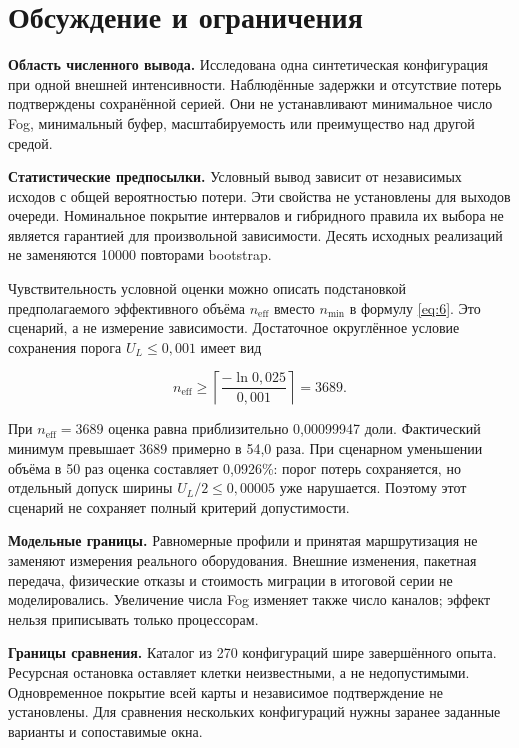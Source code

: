 \hypertarget{ux43eux431ux441ux443ux436ux434ux435ux43dux438ux435-ux438-ux43eux433ux440ux430ux43dux438ux447ux435ux43dux438ux44f}{%
\FloatBarrier
\section{Обсуждение и ограничения}}

\textbf{Область численного вывода.} Исследована одна синтетическая конфигурация при одной внешней интенсивности. Наблюдённые задержки и отсутствие потерь подтверждены сохранённой серией. Они не устанавливают минимальное число Fog, минимальный буфер, масштабируемость или преимущество над другой средой.

\textbf{Статистические предпосылки.} Условный вывод зависит от независимых исходов с общей вероятностью потери. Эти свойства не установлены для выходов очереди. Номинальное покрытие интервалов и гибридного правила их выбора не является гарантией для произвольной зависимости. Десять исходных реализаций не заменяются 10000 повторами bootstrap.

Чувствительность условной оценки можно описать подстановкой предполагаемого эффективного объёма \(n_{\mathrm{eff}}\) вместо \(n_{\min}\) в формулу \eqref{eq:6}. Это сценарий, а не измерение зависимости. Достаточное округлённое условие сохранения порога \(U_L\leq0{,}001\) имеет вид

\begin{equation}\label{eq:9}
n_{\mathrm{eff}}\geq
\left\lceil\frac{-\ln0{,}025}{0{,}001}\right\rceil=3689.
\end{equation}

При \(n_{\mathrm{eff}}=3689\) оценка равна приблизительно 0,00099947 доли. Фактический минимум превышает 3689 примерно в 54,0 раза. При сценарном уменьшении объёма в 50 раз оценка составляет 0,0926\%: порог потерь сохраняется, но отдельный допуск ширины \(U_L/2\leq0{,}00005\) уже нарушается. Поэтому этот сценарий не сохраняет полный критерий допустимости.

\textbf{Модельные границы.} Равномерные профили и принятая маршрутизация не заменяют измерения реального оборудования. Внешние изменения, пакетная передача, физические отказы и стоимость миграции в итоговой серии не моделировались. Увеличение числа Fog изменяет также число каналов; эффект нельзя приписывать только процессорам.

\textbf{Границы сравнения.} Каталог из 270 конфигураций шире завершённого опыта. Ресурсная остановка оставляет клетки неизвестными, а не недопустимыми. Одновременное покрытие всей карты и независимое подтверждение не установлены. Для сравнения нескольких конфигураций нужны заранее заданные варианты и сопоставимые окна.

